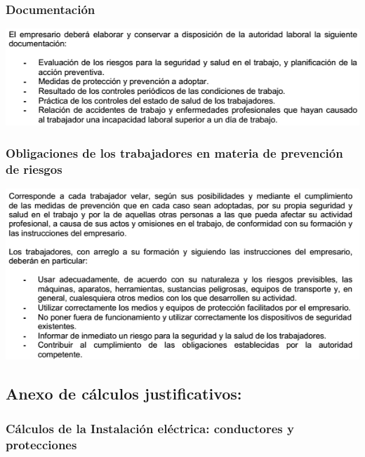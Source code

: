 \subsubsection{Documentación}
\includegraphics[width=15cm,keepaspectratio]{Memoria/EBSS/9.png}
\subsubsection{Obligaciones de los trabajadores en materia de prevención de riesgos}
\includegraphics[width=15cm,keepaspectratio]{Memoria/EBSS/10.png}

\newpage




\subsection{Anexo de cálculos justificativos:}

\subsubsection{Cálculos de la Instalación eléctrica: conductores y protecciones}




\pagebreak



\pagebreak



